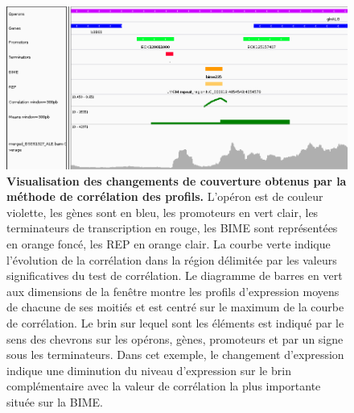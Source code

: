 \documentclass[12pt,a4paper]{report}
\begin{document}
\begin{onehalfspace}
\begin{figure}[h!]
\centerline{\includegraphics[scale=0.53]{figures/igv_profil.png}}
\caption{\textbf{Visualisation des changements de couverture obtenus par la méthode de corrélation des profils.} L'opéron est de couleur violette, les gènes sont en bleu, les promoteurs en vert clair, les terminateurs de transcription en rouge, les BIME sont représentées en orange foncé, les REP en orange clair. La courbe verte indique l'évolution de la corrélation dans la région délimitée par les valeurs significatives du test de corrélation. Le diagramme de barres en vert aux dimensions de la fenêtre montre les profils d'expression moyens de chacune de ses moitiés et est centré sur le maximum de la courbe de corrélation. Le brin sur lequel sont les éléments est indiqué par le sens des chevrons sur les opérons, gènes, promoteurs et par un signe sous les terminateurs. Dans cet exemple, le changement d'expression indique une diminution du niveau d'expression sur le brin complémentaire avec la valeur de corrélation la plus importante située sur la BIME.} 
\label{fig:igv_profil}
\end{figure}


\end{onehalfspace}
\end{document}
